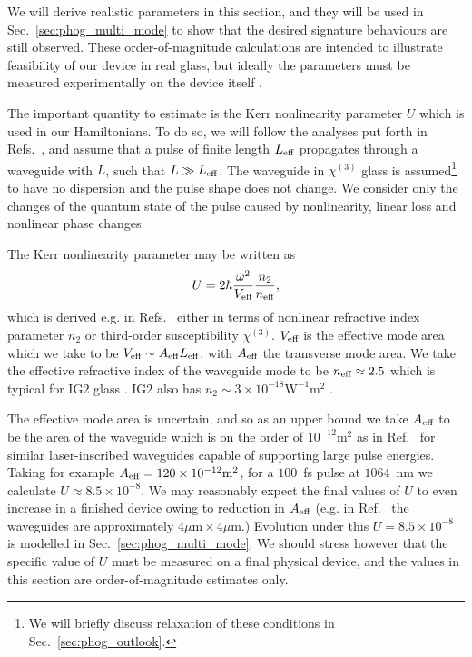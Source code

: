 We will derive realistic parameters in this section, and they will be used in Sec.~\ref{sec:phog_multi_mode} to show that the desired signature behaviours are still observed. These order-of-magnitude calculations are intended to illustrate feasibility of our device in real glass, but ideally the parameters must be measured experimentally on the device itself \cite{Wang2014}.

The important quantity to estimate is the Kerr nonlinearity parameter $U$ which is used in our Hamiltonians. To do so, we will follow the analyses put forth in Refs.~\cite{Drummond1980, Imoto1985, Kitagawa1986}, and assume that a pulse of finite length $L_{\text{eff}}$ propagates through a waveguide with $L$, such that $L \gg L_{\text{eff}}$. The waveguide in $\chi^{\left(3\right)}$ glass is assumed\footnote{We will briefly discuss relaxation of these conditions in Sec.~\ref{sec:phog_outlook}.} to have no dispersion and the pulse shape does not change. We consider only the changes of the quantum state of the pulse caused by nonlinearity, linear loss and nonlinear phase changes. 

The Kerr nonlinearity parameter may be written as 
\begin{equation}
U = 2 \hbar \frac{\omega^2}{V_{\text{eff}}} \frac{n_2}{n_{\text{eff}}},
\end{equation}
which is derived e.g. in Refs.~\cite{Imoto1985, Kitagawa1986, Drummond1980} either in terms of nonlinear refractive index parameter $n_2$ or third-order susceptibility $\chi^{\left(3\right)}$. $V_{\text{eff}}$ is the effective mode area which we take to be $V_{\text{eff}} \sim A_{\text{eff}} L_{\text{eff}}$, with $A_{\text{eff}}$ the transverse mode area. We take the effective refractive index of the waveguide mode to be $n_{\text{eff}} \approx 2.5$ which is typical for IG$2$ glass \cite{ig2}. IG$2$ also has $n_2 \sim 3 \times 10^{-18} \text{W}^{-1} \text{m}^2$ \cite{Demetriou2017, Wang2014}. %

The effective mode area is uncertain, and so as an upper bound we take $A_{\text{eff}}$ to be the area of the waveguide which is on the order of $10^{-12}\text{m}^2$ as in Ref.~\cite{Mukherjee2017} for similar laser-inscribed waveguides  capable of supporting large pulse energies. Taking for example $A_{\text{eff}} = 120\times10^{-12} \text{m}^2$, for a $100$~fs pulse at $1064$~nm we calculate $U \approx 8.5\times 10^{-8}$. We may reasonably expect the final values of $U$ to even increase in a finished device owing to reduction in $A_{\text{eff}}$ (e.g. in Ref.~\cite{Mukherjee2017} the waveguides are approximately $4 \mu\text{m} \times 4 \mu\text{m}$.) Evolution under this $U = 8.5\times10^{-8}$ is modelled in Sec.~\ref{sec:phog_multi_mode}. We should stress however that the specific value of $U$ must be measured on a final physical device, and the values in this section are order-of-magnitude estimates only.

